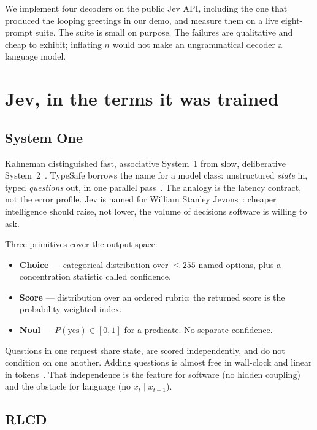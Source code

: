 \documentclass[11pt,twocolumn]{article}
\begin{document}
We implement four decoders on the public Jev API, including the one that produced the looping greetings in our demo, and measure them on a live eight-prompt suite. The suite is small on purpose. The failures are qualitative and cheap to exhibit; inflating $n$ would not make an ungrammatical decoder a language model.

\section{Jev, in the terms it was trained}

\subsection{System One}

Kahneman distinguished fast, associative System~1 from slow, deliberative System~2~\cite{kahneman2011}. TypeSafe borrows the name for a model class: unstructured \emph{state} in, typed \emph{questions} out, in one parallel pass~\cite{typesafe2026docs}. The analogy is the latency contract, not the error profile. Jev is named for William Stanley Jevons~\cite{jevons1865}: cheaper intelligence should raise, not lower, the volume of decisions software is willing to ask.

Three primitives cover the output space:

\begin{itemize}
\item \textbf{Choice} --- categorical distribution over $\le 255$ named options, plus a concentration statistic called confidence.
\item \textbf{Score} --- distribution over an ordered rubric; the returned score is the probability-weighted index.
\item \textbf{Noul} --- $P(\mathrm{yes})\in[0,1]$ for a predicate. No separate confidence.
\end{itemize}

Questions in one request share state, are scored independently, and do not condition on one another. Adding questions is almost free in wall-clock and linear in tokens~\cite{typesafe2026docs}. That independence is the feature for software (no hidden coupling) and the obstacle for language (no $x_{t}\mid x_{t-1}$).

\subsection{RLCD}
\end{document}
